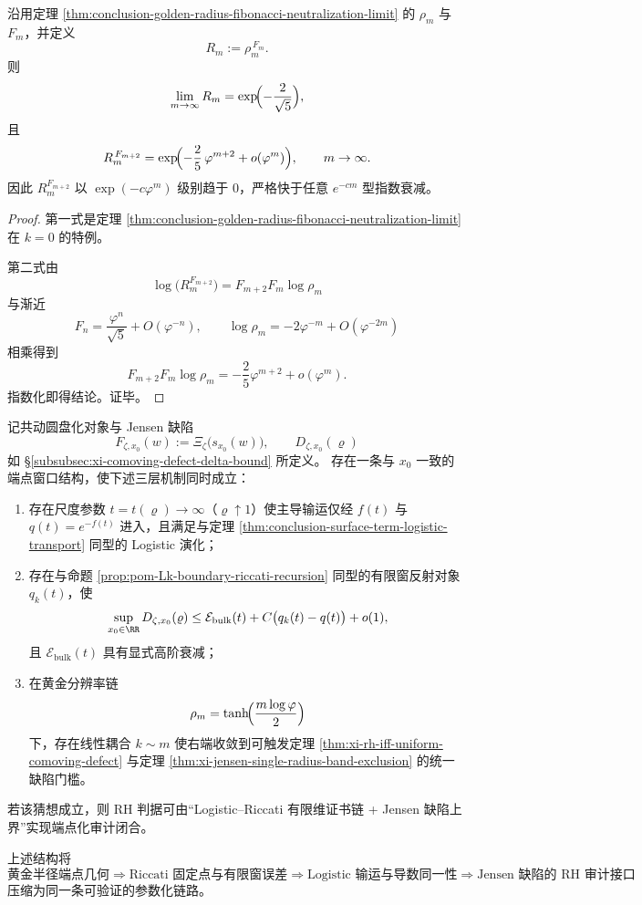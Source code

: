 \begin{theorem}\label{thm:conclusion-golden-fibonacci-mixed-power-superexponential}
沿用定理 \ref{thm:conclusion-golden-radius-fibonacci-neutralization-limit} 的 \(\rho_m\) 与 \(F_m\)，并定义
\[
R_m:=\rho_m^{\,F_m}.
\]
则
\[
\lim_{m\to\infty}R_m=\exp\!\Bigl(-\frac{2}{\sqrt5}\Bigr),
\]
且
\[
R_m^{\,F_{m+2}}
=
\exp\!\Bigl(-\frac{2}{5}\,\varphi^{m+2}+o(\varphi^m)\Bigr),
\qquad m\to\infty.
\]
因此 \(R_m^{F_{m+2}}\) 以 \(\exp(-c\varphi^m)\) 级别趋于 \(0\)，严格快于任意 \(e^{-cm}\) 型指数衰减。
\end{theorem}
\begin{proof}
第一式是定理 \ref{thm:conclusion-golden-radius-fibonacci-neutralization-limit} 在 \(k=0\) 的特例。

第二式由
\[
\log\!\bigl(R_m^{F_{m+2}}\bigr)=F_{m+2}F_m\log\rho_m
\]
与渐近
\[
F_n=\frac{\varphi^n}{\sqrt5}+O(\varphi^{-n}),
\qquad
\log\rho_m=-2\varphi^{-m}+O(\varphi^{-2m})
\]
相乘得到
\[
F_{m+2}F_m\log\rho_m
=-\frac{2}{5}\varphi^{m+2}+o(\varphi^m).
\]
指数化即得结论。证毕。
\end{proof}

\begin{conjecture}\label{conj:conclusion-endpoint-logistic-universality-rh-interface}
记共动圆盘化对象与 Jensen 缺陷
\[
F_{\zeta,x_0}(w):=\Xi_\zeta\!\bigl(s_{x_0}(w)\bigr),\qquad
D_{\zeta,x_0}(\varrho)
\]
如 \S\ref{subsubsec:xi-comoving-defect-delta-bound} 所定义。
存在一条与 \(x_0\) 一致的端点窗口结构，使下述三层机制同时成立：
\begin{enumerate}
  \item 存在尺度参数 \(t=t(\varrho)\to\infty\)（\(\varrho\uparrow1\)）使主导输运仅经 \(f(t)\) 与 \(q(t)=e^{-f(t)}\) 进入，且满足与定理 \ref{thm:conclusion-surface-term-logistic-transport} 同型的 Logistic 演化；
  \item 存在与命题 \ref{prop:pom-Lk-boundary-riccati-recursion} 同型的有限窗反射对象 \(q_k(t)\)，使
  \[
  \sup_{x_0\in\RR}D_{\zeta,x_0}(\varrho)
  \le
  \mathcal E_{\mathrm{bulk}}(t)+C\bigl(q_k(t)-q(t)\bigr)+o(1),
  \]
  且 \(\mathcal E_{\mathrm{bulk}}(t)\) 具有显式高阶衰减；
  \item 在黄金分辨率链
  \[
  \rho_m=\tanh\!\Bigl(\frac{m\log\varphi}{2}\Bigr)
  \]
  下，存在线性耦合 \(k\sim m\) 使右端收敛到可触发定理 \ref{thm:xi-rh-iff-uniform-comoving-defect} 与定理 \ref{thm:xi-jensen-single-radius-band-exclusion} 的统一缺陷门槛。
\end{enumerate}
若该猜想成立，则 RH 判据可由“Logistic--Riccati 有限维证书链 + Jensen 缺陷上界”实现端点化审计闭合。
\end{conjecture}

\begin{remark}[统一读出链]\label{rem:conclusion-golden-radius-riccati-logistic-chain}
上述结构将
\[
\text{黄金半径端点几何}
\Longrightarrow
\text{Riccati 固定点与有限窗误差}
\Longrightarrow
\text{Logistic 输运与导数同一性}
\Longrightarrow
\text{Jensen 缺陷的 RH 审计接口}
\]
压缩为同一条可验证的参数化链路。
\end{remark}
